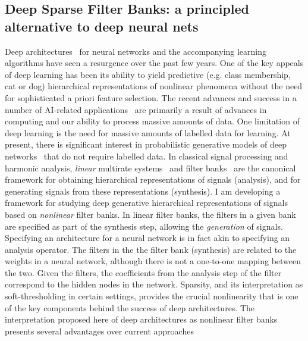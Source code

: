 \documentclass[12pt]{article}
\begin{document}
\subsection*{Deep Sparse Filter Banks: a principled alternative to deep neural nets}

Deep architectures~\cite{lecun2015deep} for neural networks and the accompanying learning algorithms have seen a resurgence over the past few years. One of the key appeals of deep learning has been its ability to yield predictive (e.g. class membership, cat or dog) hierarchical representations of nonlinear phenomena without the need for sophisticated a priori feature selection. The recent advances and success in a number of AI-related applications~\cite{bengio2009learning} are primarily a result of advances in computing and our ability to process massive amounts of data. One limitation of deep learning is the need for massive amounts of labelled data for learning. At present, there is significant interest in probabilistic generative models of deep networks~\cite{patel2015probabilistic} that do not require labelled data. %
In classical signal processing and harmonic analysis, \emph{linear} multirate systems~\cite{fliege1994multirate} and filter banks~\cite{strang1996wavelets,daubechies1992ten} are the canonical framework for obtaining hierarchical representations of signals (analysis), and for generating signals from these representations (synthesis). I am developing a framework for studying deep generative hierarchical representations of signals based on \emph{nonlinear} filter banks. In linear filter banks, the filters in a given bank are specified as part of the synthesis step, allowing the \emph{generation} of signals. Specifying an architecture for a neural network is in fact akin to specifying an analysis operator. The filters in the the filter bank (synthesis) are related to the weights in a neural network, although there is not a one-to-one mapping between the two. Given the filters, the coefficients from the analysis step of the filter correspond to the hidden nodes in the network. Sparsity, and its interpretation as soft-thresholding in certain settings, provides the crucial nonlinearity that is one of the key components behind the success of deep architectures. The interpretation proposed here of deep architectures as nonlinear filter banks presents several advantages over current approaches
\end{document}
